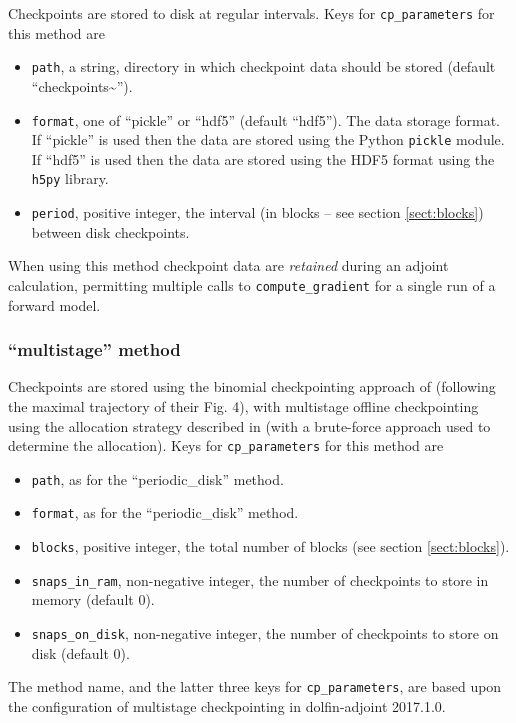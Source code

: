 \documentclass[11pt]{article}
\begin{document}
Checkpoints are stored to disk at regular intervals. Keys for
\texttt{cp\_parameters} for this method are
\begin{itemize}
  \item \texttt{path}, a string, directory in which checkpoint data should be
    stored (default ``checkpoints\textasciitilde'').
  \item \texttt{format}, one of ``pickle'' or ``hdf5'' (default ``hdf5''). The
    data storage format. If ``pickle'' is used then the data are stored using
    the Python \texttt{pickle} module. If ``hdf5'' is used then the data are
    stored using the HDF5 format \citep{hdf5} using the \texttt{h5py} library.
  \item \texttt{period}, positive integer, the interval (in blocks -- see
    section \ref{sect:blocks}) between disk checkpoints.
\end{itemize}

When using this method checkpoint data are \emph{retained} during an adjoint
calculation, permitting multiple calls to \texttt{compute\_gradient} for a
single run of a forward model.

\subsubsection{``multistage'' method}

Checkpoints are stored using the binomial checkpointing approach of
\citet{griewank2000} (following the maximal trajectory of their Fig. 4), with
multistage offline checkpointing using the allocation strategy described in
\citet{stumm2009} (with a brute-force approach used to determine the
allocation). Keys for \texttt{cp\_parameters} for this method are
\begin{itemize}
  \item \texttt{path}, as for the ``periodic\_disk'' method.
  \item \texttt{format}, as for the ``periodic\_disk'' method.
  \item \texttt{blocks}, positive integer, the total number of blocks (see
    section \ref{sect:blocks}).
  \item \texttt{snaps\_in\_ram}, non-negative integer, the number of
    checkpoints to store in memory (default $0$).
  \item \texttt{snaps\_on\_disk}, non-negative integer, the number of
    checkpoints to store on disk (default $0$).
\end{itemize}
The method name, and the latter three keys for \texttt{cp\_parameters}, are
based upon the configuration of multistage checkpointing in dolfin-adjoint
2017.1.0.
\end{document}
